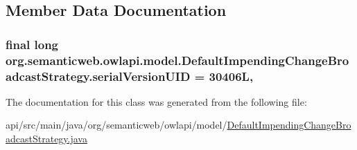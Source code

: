 \subsection{Member Data Documentation}
\hypertarget{classorg_1_1semanticweb_1_1owlapi_1_1model_1_1_default_impending_change_broadcast_strategy_afe93a1e8165dcbe13b5b58a5929ff385}{
\subsubsection[{serial\-Version\-U\-I\-D}]{\setlength{\rightskip}{0pt plus 5cm}final long org.\-semanticweb.\-owlapi.\-model.\-Default\-Impending\-Change\-Broadcast\-Strategy.\-serial\-Version\-U\-I\-D = 30406\-L\hspace{0.3cm}{\ttfamily [static]}, {\ttfamily [private]}}}\label{classorg_1_1semanticweb_1_1owlapi_1_1model_1_1_default_impending_change_broadcast_strategy_afe93a1e8165dcbe13b5b58a5929ff385}


The documentation for this class was generated from the following file\-:\begin{DoxyCompactItemize}
\item 
api/src/main/java/org/semanticweb/owlapi/model/\hyperlink{_default_impending_change_broadcast_strategy_8java}{Default\-Impending\-Change\-Broadcast\-Strategy.\-java}\end{DoxyCompactItemize}
